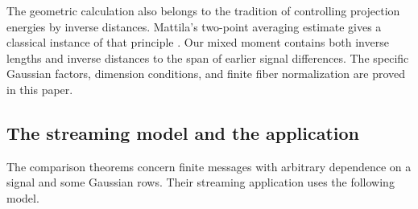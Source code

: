 The geometric calculation also belongs to the tradition of
controlling projection energies by inverse distances.  Mattila's
two-point averaging estimate gives a classical instance of that
principle \cite[proof of Lemma~5.1, p.~236]{Mattila1975}.  Our mixed moment
contains both inverse lengths and inverse distances to the span of
earlier signal differences.  The specific Gaussian factors,
dimension conditions, and finite fiber normalization are proved in
this paper.

\subsection*{The streaming model and the application}

The comparison theorems concern finite messages with arbitrary
dependence on a signal and some Gaussian rows.  Their streaming
application uses the following model.

